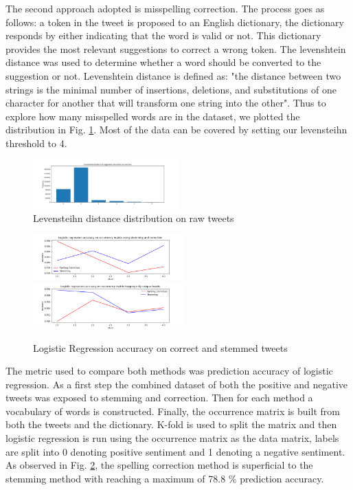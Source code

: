 \documentclass[10pt,conference,compsocconf]{IEEEtran}
\begin{document}
The second approach adopted is misspelling correction. The process goes as follows: a token in the tweet is proposed to an English dictionary, the dictionary responds by either indicating that the word is valid or not. This dictionary provides the most relevant suggestions to correct a wrong token. The levenshtein distance was used to determine whether a word should be converted to the suggestion or not. Levenshtein distance is defined as: "the distance between two strings is the minimal number of insertions, deletions, and substitutions of one character for another that will transform one string into the other". Thus to explore how many misspelled words are in the dataset, we plotted the distribution in Fig. \ref{levDistA}. Most of the data can be covered by setting our levensteihn threshold to 4.
\begin{figure}[!htb]
	\centering \includegraphics[width = 0.5\textwidth]{../plots/distributionA.png}
	\caption{Levensteihn distance distribution on raw tweets}
	\label{levDistA}
\end{figure}

\begin{figure}[!htb]
	\centering \includegraphics[width=220px]{../plots/raw.png}
	\centering \includegraphics[width=220px]{../plots/redundant.png}
	\caption{Logistic Regression accuracy on correct and stemmed tweets}
	\label{raw}
\end{figure}

The metric used to compare both methods was prediction accuracy of logistic regression. As a first step the combined dataset of both the positive and negative tweets was exposed to stemming and correction. Then for each method a vocabulary of words is constructed. Finally, the occurrence matrix is built from both the tweets and the dictionary. K-fold is used to split the matrix and then logistic regression is run using the occurrence matrix as the data matrix, labels are split into 0 denoting positive sentiment and 1 denoting a negative sentiment.  As observed in Fig. \ref{raw}, the spelling correction method is superficial to the stemming method with reaching a maximum of 78.8 \% prediction accuracy.
\end{document}
